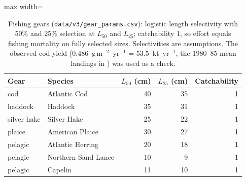\documentclass[11pt,letterpaper,fleqn]{article}
\newcommand{\gm}{g\,m$^{-2}$}
\begin{document}
\begin{table}[p]\caption{Fishing gears (\nolinkurl{data/v3/gear_params.csv}): logistic length selectivity with 50\% and 25\% selection at $L_{50}$ and $L_{25}$; catchability 1, so effort equals fishing mortality on fully selected sizes. Selectivities are assumptions. The observed cod yield (0.486~\gm{}~yr$^{-1}$ = 53.5~kt~yr$^{-1}$, the 1980--85 mean landings in \citeauthor{fanning2003assessment} \citeyear{fanning2003assessment}) was used as a check.}\label{tab:S-gear}
\centering\small\begin{adjustbox}{max width=\textwidth}\begin{tabular}{@{}llrrr@{}}\toprule
Gear & Species & $L_{50}$ (cm) & $L_{25}$ (cm) & Catchability\\\midrule
cod & Atlantic Cod & 40 & 35 & 1\\
haddock & Haddock & 35 & 31 & 1\\
silver hake & Silver Hake & 25 & 22 & 1\\
plaice & American Plaice & 30 & 27 & 1\\
pelagic & Atlantic Herring & 20 & 18 & 1\\
pelagic & Northern Sand Lance & 10 & 9 & 1\\
pelagic & Capelin & 11 & 10 & 1\\
\bottomrule\end{tabular}\end{adjustbox}\end{table}
\end{document}
